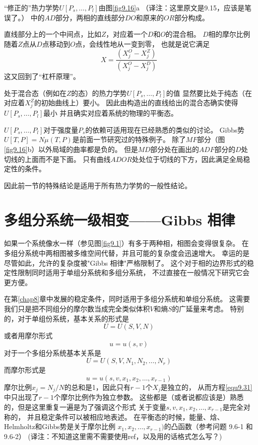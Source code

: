 “修正的”热力学势$U[P_s,\ldots,P_l]$由图\ref{fig9.16}a
（译注：这里原文是9.15，应该是笔误了。）
中的$AD$部分，两相的直线部分$DO$和原来的$OR$部分构成。

直线部分上的一个中间点，比如$Z$，对应着一个$D$和$O$的混合相。
$D$相的摩尔比例随着$Z$点从$D$点移动到$O$点，会线性地从一变到零，
也就是说它满足
\begin{equation*}
X=\frac{(X_j^O-X_j^Z)}{(X_j^O-X_j^D)}
\end{equation*}
这又回到了“杠杆原理”。

处于混合态（例如在$Z$的态）的热力学势$U[P_s,\ldots,P_l]$的值
显然要比处于纯态（在对应着$X_j^Z$的初始曲线上）要小。
因此由构造出的直线给出的混合态确实使得$U[P_s,\ldots,P_l]$最小
并且确实对应着系统的物理的平衡态。

$U[P_s,\ldots,P_l]$对于强度量$P_s$的依赖可适用现在已经熟悉的类似的讨论。
Gibbs势$U[T,P]=N\mu(T,P)$是前面一节研究过的特殊例子。
除了$MF$部分（图\ref{fig9.16}b）以外局域的曲率都是负的。
但是$MD$部分处在画出的$ADF$部分的$D$处切线的上面而不是下面。
只有曲线$ADOR$处处位于切线的下方，因此满足全局稳定性的条件。

因此前一节的特殊结论是适用于所有热力学势的一般性结论。

\section{多组分系统一级相变——Gibbs 相律}
\label{sec9.6}

如果一个系统像水一样（参见图\ref{fig9.1}）有多于两种相，相图会变得很复杂。
在多组分系统中两相图被多维空间代替，并且可能的复杂度会迅速增大。
幸运的是尽管如此，允许的复杂度被"Gibbs 相律"严格限制了。
这个对于相的边界形式的稳定性限制同时适用于单组分系统和多组分系统，
不过直接在一般情况下研究它会更方便。

在第\ref{chap8}章中发展的稳定条件，同时适用于多组分系统和单组分系统。
这需要我们只是把不同组分的摩尔数当成完全类似体积$V$和熵$S$的广延量来考虑。
特别的，对于单组份系统，基本关系的形式是
\begin{equation}
\label{equ9.28}
U=U(S,V,N)
\end{equation}
或者用摩尔形式
\begin{equation}
\label{equ9.29}
u=u(s,v)
\end{equation}
对于一个多组分系统基本关系是
\begin{equation}
\label{equ9.30}
U=U(S,V,N_1,N_2,\ldots,N_r)
\end{equation}
而摩尔形式是
\begin{equation}
\label{equ9.31}
u=u(s,v,x_1,x_2,\ldots,x_{r-1})
\end{equation}
摩尔比例$x_j=N_j/N$的总和是1，因此只有$r-1$个$X_j$是独立的，
从而方程\eqref{equ9.31}中只出现了$r-1$个摩尔比例作为独立参数。
这些都是（或者说都应该是）熟悉的，但是这里重复一遍是为了强调这个形式
关于变量$s,v,x_1,x_2,\ldots,x_{r-1}$是完全对称的，
并且稳定条件可以被相应地表述。
在平衡态的时候，能量、焓、Helmholtz和Gibbs势是关于摩尔比例
$x_1,x_2,\ldots,x_{r-1})$的凸函数（参考问题 9.6-1 和9.6-2）
(译注：不知道这里需不需要使用ref，以及用的话格式怎么写？)

